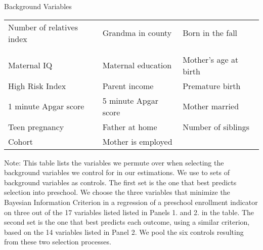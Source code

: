\begin{threeparttable}
\caption{Background Variables}
\label{tab:pselectvars}
\begin{tabular}{C{5cm} C{5cm} C{5cm}}
\toprule
{} \\
\midrule
Number of relatives index	& Grandma in county	& Born in the fall \\\\
\midrule
{} \\
\midrule
Maternal IQ			& Maternal education		& Mother's age at birth \\
High Risk Index		& Parent income			& Premature birth \\
1 minute Apgar score	& 5 minute Apgar score	& Mother married \\
Teen pregnancy		& Father at home			& Number of siblings \\
Cohort 				& Mother is employed		& \\
\bottomrule
\end{tabular}
\begin{tablenotes}
\item Note: This table lists the variables we permute over when selecting the background variables we control for in our estimations. We use to sets of background variables as controls. The first set is the one that best predicts selection into preschool. We choose the three variables that minimize the Bayesian Information Criterion in a regression of a preschool enrollment indicator on three out of the 17 variables listed listed in Panels 1. and 2. in the table. The second set is the one that best predicts each outcome, using a similar criterion, based on the 14 variables listed in Panel 2. We pool the six controls resulting from these two selection processes.
\end{tablenotes}
\end{threeparttable}